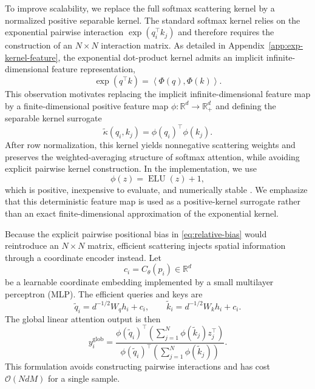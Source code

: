 \documentclass{article}
\newcommand{\R}{\mathbb{R}}
\newcommand{\ELU}{\operatorname{ELU}}
\begin{document}
To improve scalability, we replace the full softmax scattering kernel by a normalized positive separable kernel. The standard softmax kernel relies on the exponential pairwise interaction $\exp(q_i^\top k_j)$ and therefore requires the construction of an $N\times N$ interaction matrix. As detailed in Appendix~\ref{app:exp-kernel-feature}, the exponential dot-product kernel admits an implicit infinite-dimensional feature representation,
\begin{equation}
    \exp(q^\top k)
    =
    \left\langle \Phi(q),\Phi(k)\right\rangle .
\end{equation}
This observation motivates replacing the implicit infinite-dimensional feature map by a finite-dimensional positive feature map 
$\phi:\R^d\to\R_+^d$ and defining the separable kernel surrogate
\begin{equation}\label{eq:positive-separable-kernel}
    \widetilde\kappa(q_i,k_j) = \phi(q_i)^\top\phi(k_j).
\end{equation}
After row normalization, this kernel yields nonnegative scattering weights and preserves the weighted-averaging structure of softmax attention, while avoiding explicit pairwise kernel construction. 
In the implementation, we use
\begin{equation}
    \phi(z)=\ELU(z)+1,
    \label{eq:elu-feature-map}
\end{equation}
which is positive, inexpensive to evaluate, and numerically stable \cite{katharopoulos2020transformers}. 
We emphasize that this deterministic feature map is used as a positive-kernel surrogate rather than an exact finite-dimensional approximation of the exponential kernel.

Because the explicit pairwise positional bias in \eqref{eq:relative-bias} would reintroduce an $N \times N$ matrix, efficient scattering injects spatial information through a coordinate encoder instead. Let
\begin{equation}
    c_i = C_\theta(p_i)\in\R^d
\end{equation}
be a learnable coordinate embedding implemented by a small multilayer perceptron (MLP). The efficient queries and keys are
\begin{equation}
    \widetilde q_i=d^{-1/2}W_qh_i+c_i,
    \qquad
    \widetilde k_i=d^{-1/2}W_kh_i+c_i.
    \label{eq:coord-qk}
\end{equation}
The global linear attention output is then
\begin{equation}
    y_i^{\mathrm{glob}}
    =
    \frac{
    \phi(\widetilde q_i)^\top
    \left(\sum_{j=1}^{N}\phi(\widetilde k_j)z_j^\top\right)
    }{
    \phi(\widetilde q_i)^\top
    \left(\sum_{j=1}^{N}\phi(\widetilde k_j)\right)
    }.
    \label{eq:linear-attention}
\end{equation}
This formulation avoids constructing pairwise interactions and has cost $\mathcal{O}(NdM)$ for a single sample.
\end{document}

